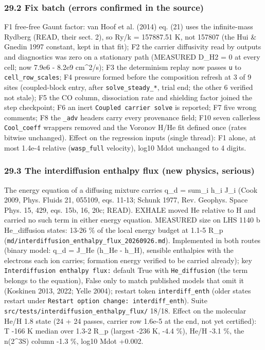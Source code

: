 \documentclass[english,a4paper]{my_memo}
\begin{document}
\subsubsection{29.2 Fix batch (errors confirmed in the source)}\label{292-fix-batch-errors-confirmed-in-the-source}

F1 free-free Gaunt factor: van Hoof et al. (2014) eq. (21) uses the
infinite-mass Rydberg (READ, their sect. 2), so Ry/k = 157887.51 K, not
157807 (the Hui \& Gnedin 1997 constant, kept in that fit); F2 the carrier
diffusivity read by outputs and diagnostics was zero on a stationary path
(MEASURED D\_H2 = 0 at every cell; now 7.9e6 - 8.2e9 cm\^{}2/s); F3 the
determinism replay now passes \texttt{u} to \texttt{cell\_row\_scales}; F4 pressure formed
before the composition refresh at 3 of 9 sites (coupled-block entry, after
\texttt{solve\_steady\_*}, trial end; the other 6 verified not stale); F5 the CO
column, dissociation rate and shielding factor joined the step checkpoint;
F6 an inert \texttt{Coupled\ carrier\ solve} is reported; F7 five wrong comments;
F8 the \texttt{\_adv} headers carry every provenance field; F10 seven callerless
\texttt{Cool\_coeff} wrappers removed and the Voronov H/He fit defined once
(rates bitwise unchanged). Effect on the regression inputs (single thread):
F1 alone, at most 1.4e-4 relative (\texttt{wasp\_full} velocity), log10 Mdot
unchanged to 4 digits.

\subsubsection{29.3 The interdiffusion enthalpy flux (new physics, serious)}\label{293-the-interdiffusion-enthalpy-flux-new-physics-serious}

The energy equation of a diffusing mixture carries q\_d = sum\_i h\_i J\_i
(Cook 2009, Phys. Fluids 21, 055109, eqs. 11-13; Schunk 1977, Rev. Geophys.
Space Phys. 15, 429, eqs. 15b, 16, 20c; READ). EXHALE moved He relative to H
and carried no such term in either energy equation. MEASURED size on LHS
1140 b He\_diffusion states: 13-26 \% of the local energy budget at
1.1-5 R\_p (\texttt{md/interdiffusion\_enthalpy\_flux\_20260926.md}). Implemented in
both routes (binary model: q\_d = J\_He (h\_He - h\_H), sensible enthalpies
with the electrons each ion carries; formation energy verified to be
carried already); key \texttt{Interdiffusion\ enthalpy\ flux:} default True with
\texttt{He\_diffusion} (the term belongs to the equation), False only to match
published models that omit it (Koskinen 2013, 2022; Yelle 2004); restart
token \texttt{interdiff\_enth} (older states restart under
\texttt{Restart\ option\ change:\ interdiff\_enth}). Suite
\texttt{src/tests/interdiffusion\_enthalpy\_flux/} 18/18. Effect on the molecular
He/H 1.8 state (24 + 24 passes, carrier row 1.6e-5 at the end, not yet
certified): T -166 K median over 1.3-2 R\_p (largest -236 K, -4.4 \%),
He/H -3.1 \%, the n(2\^{}3S) column -1.3 \%, log10 Mdot +0.002.
\end{document}
